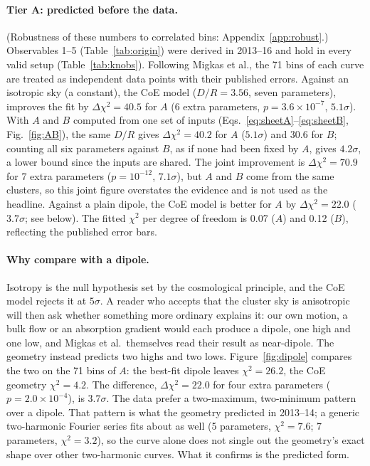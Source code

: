 \documentclass[11pt,a4paper]{article}
\begin{document}
\paragraph{Tier A: predicted before the data.} (Robustness of these numbers to correlated bins: Appendix~\ref{app:robust}.) Observables 1--5 (Table~\ref{tab:origin}) were derived in 2013--16 and hold in every valid setup (Table~\ref{tab:knobs}). Following Migkas et al., the 71 bins of each curve are treated as independent data points with their published errors. Against an isotropic sky (a constant), the CoE model ($D/R=3.56$, seven parameters), improves the fit by $\Delta\chi^2=40.5$ for $A$ (6 extra parameters, $p=3.6\times10^{-7}$, $5.1\sigma$). With $A$ and $B$ computed from one set of inputs (Eqs.~\ref{eq:sheetA}--\ref{eq:sheetB}, Fig.~\ref{fig:AB}), the same $D/R$ gives $\Delta\chi^2=40.2$ for $A$ ($5.1\sigma$) and $30.6$ for $B$; counting all six parameters against $B$, as if none had been fixed by $A$, gives $4.2\sigma$, a lower bound since the inputs are shared. The joint improvement is $\Delta\chi^2=70.9$ for 7 extra parameters ($p=10^{-12}$, $7.1\sigma$), but $A$ and $B$ come from the same clusters, so this joint figure overstates the evidence and is not used as the headline. Against a plain dipole, the CoE model is better for $A$ by $\Delta\chi^2=22.0$ ($3.7\sigma$; see below). The fitted $\chi^2$ per degree of freedom is 0.07 ($A$) and 0.12 ($B$), reflecting the published error bars.

\paragraph{Why compare with a dipole.} Isotropy is the null hypothesis set by the cosmological principle, and the CoE model rejects it at $5\sigma$. A reader who accepts that the cluster sky is anisotropic will then ask whether something more ordinary explains it: our own motion, a bulk flow or an absorption gradient would each produce a dipole, one high and one low, and Migkas et al.\ themselves read their result as near-dipole. The geometry instead predicts two highs and two lows. Figure~\ref{fig:dipole} compares the two on the 71 bins of $A$: the best-fit dipole leaves $\chi^2=26.2$, the CoE geometry $\chi^2=4.2$. The difference, $\Delta\chi^2=22.0$ for four extra parameters ($p=2.0\times10^{-4}$), is $3.7\sigma$. The data prefer a two-maximum, two-minimum pattern over a dipole. That pattern is what the geometry predicted in 2013--14; a generic two-harmonic Fourier series fits about as well (5 parameters, $\chi^2=7.6$; 7 parameters, $\chi^2=3.2$), so the curve alone does not single out the geometry's exact shape over other two-harmonic curves. What it confirms is the predicted form.
\end{document}
